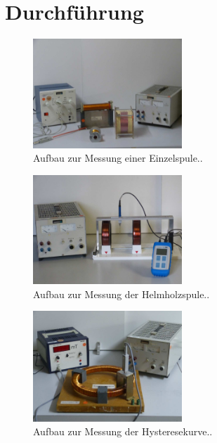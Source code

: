 \section{Durchführung}
\label{sec:Durchführung}
\begin{figure}
  \centering
  \includegraphics[width=0.5\textwidth]{content/images/aufbau1.png}
  \caption{Aufbau zur Messung einer Einzelspule.\cite{anleitung}.}
  \label{fig:a1}
\end{figure}
\begin{figure}
  \centering
  \includegraphics[width=0.5\textwidth]{content/images/aufbau2.png}
  \caption{Aufbau zur Messung der Helmholzspule.\cite{anleitung}.}
  \label{fig:a2}
\end{figure}
\begin{figure}
  \centering
  \includegraphics[width=0.5\textwidth]{content/images/aufbau3.png}
  \caption{Aufbau zur Messung der Hysteresekurve.\cite{anleitung}.}
  \label{fig:a3}
\end{figure}
